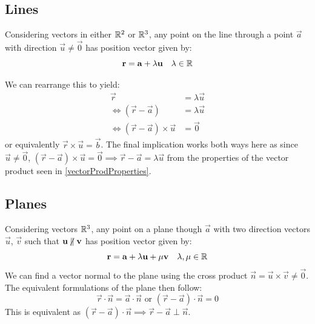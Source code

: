 \documentclass[../main.tex]{subfiles}
\begin{document}
\subsection{Lines}
Considering vectors in either $\mathbb{R}^2$ or $\mathbb{R}^3$, any point on the line through a point $\vec{a}$ with direction $\vec{u} \neq \vec{0}$ has position vector given by:
\[
  \mathbf{\bm{r}} = \mathbf{\bm{a}} + \lambda \mathbf{\bm{u}} \quad \lambda \in \mathbb{R}
\]
\begin{center}
\end{center}
We can rearrange this to yield:
\begin{align*}
  \vec{r} &= \lambda \vec{u} \\
  \iff (\vec{r} - \vec{a}) &= \lambda \vec{u} \\
  \iff (\vec{r} - \vec{a}) \times \vec{u} &= \vec{0}
\end{align*}
or equivalently $\vec{r} \times \vec{u} = \vec{b}$.
The final implication works both ways here as since $\vec{u} \neq \vec{0}$, $(\vec{r} - \vec{a}) \times \vec{u} = \vec{0} \implies \vec{r} - \vec{a} = \lambda \vec{u}$ from the properties of the vector product seen in \cref{vectorProdProperties}.
\subsection{Planes}
Considering vectors $\mathbb{R}^3$, any point on a plane though $\vec{a}$ with two direction vectors $\vec{u}$, $\vec{v}$ such that $\vec{u} \centernot\parallel \vec{v}$ has position vector given by:
\[
  \mathbf{\bm{r}} = \mathbf{\bm{a}} + \lambda \mathbf{\bm{u}} + \mu \mathbf{\bm{v}} \quad \lambda, \mu \in \mathbb{R}
\]
We can find a vector normal to the plane using the cross product $\vec{n} = \vec{u} \times \vec{v} \neq \vec{0}$.
The equivalent formulations of the plane then follow:
\[
  \vec{r} \cdot \vec{n} = \vec{a} \cdot \vec{n} \text{ or } (\vec{r} - \vec{a}) \cdot \vec{n} = 0
\]
This is equivalent as $(\vec{r} - \vec{a}) \cdot \vec{n} \implies \vec{r} - \vec{a} \perp \vec{n}$.
\end{document}

